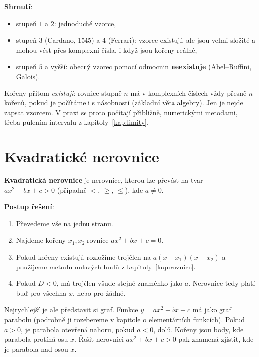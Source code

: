 \begin{definitionbox}
  \textbf{Shrnutí}:
  \begin{itemize}
    \item stupeň $1$ a $2$: jednoduché vzorce,
    \item stupeň $3$ (Cardano, 1545) a $4$ (Ferrari): vzorce existují, ale jsou velmi složité a mohou vést přes komplexní čísla, i když jsou kořeny reálné,
    \item stupeň $5$ a vyšší: obecný vzorec pomocí odmocnin \textbf{neexistuje} (Abel--Ruffini, Galois).
  \end{itemize}
  Kořeny přitom \textit{existují}: rovnice stupně $n$ má v komplexních číslech vždy přesně $n$ kořenů, pokud je počítáme i s násobností (základní věta algebry). Jen je nejde zapsat vzorcem. V praxi se proto počítají přibližně, numerickými metodami, třeba půlením intervalu z kapitoly~\ref{kap:limity}.
\end{definitionbox}

\section{Kvadratické nerovnice}\label{sec:kvadraticke-nerovnice}

\begin{definitionbox}
  \textbf{Kvadratická nerovnice} je nerovnice, kterou lze převést na tvar $ax^2 + bx + c > 0$ (případně $<$, $\geq$, $\leq$), kde $a\neq 0$.

  \vspace{0.2cm}

  \textbf{Postup řešení}:
  \begin{enumerate}
    \item Převedeme vše na jednu stranu.
    \item Najdeme kořeny $x_1, x_2$ rovnice $ax^2 + bx + c = 0$.
    \item Pokud kořeny existují, rozložíme trojčlen na $a(x - x_1)(x - x_2)$ a použijeme metodu nulových bodů z kapitoly~\ref{kap:rovnice}.
    \item Pokud $D < 0$, má trojčlen všude stejné znaménko jako $a$. Nerovnice tedy platí buď pro všechna $x$, nebo pro žádné.
  \end{enumerate}
\end{definitionbox}

Nejrychlejší je ale představit si graf. Funkce $y = ax^2 + bx + c$ má jako graf parabolu (podrobně ji rozebereme v kapitole o elementárních funkcích). Pokud $a > 0$, je parabola otevřená nahoru, pokud $a < 0$, dolů. Kořeny jsou body, kde parabola protíná osu $x$. Řešit nerovnici $ax^2 + bx + c > 0$ pak znamená zjistit, kde je parabola nad osou $x$.

